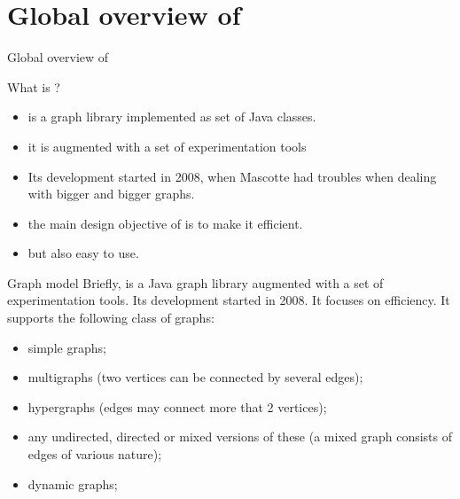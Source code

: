 \documentclass{beamer}
\newcommand{\sectionti}[1]{{\Huge #1}}
\begin{document}




\section{Global overview of \grph}
\begin{frame}
\sectionti{Global overview of \grph}
\end{frame}


\begin{frame}{What is \grph?}
\begin{itemize}
	\item \grph is a  graph \alert{library} implemented as set of Java classes.
	\item it is augmented with a set of \alert{experimentation tools}
	\item Its development started in \alert{2008}, when Mascotte had troubles when dealing with bigger and bigger graphs.
	\item the main design objective of \grph is to make it \alert{efficient}.
	\item but also easy to use.
\end{itemize}

\end{frame}

\begin{frame}{Graph model}
	  Briefly, \grph is a Java graph \alert{library} augmented with a set of \alert{experimentation tools}. Its development started in \alert{2008}. It focuses on \alert{efficiency}.
	  It supports the following class of graphs:	  
\begin{itemize}
  \item simple graphs;
  \item multigraphs (two vertices can be connected by several edges);
  \item \alert{hypergraphs} (edges may connect more that 2 vertices);
  \item any undirected, directed or \alert{mixed} versions of these (a mixed graph consists of
  edges of various nature);
  \item dynamic graphs;
\end{itemize}
\end{frame}
\end{document}
